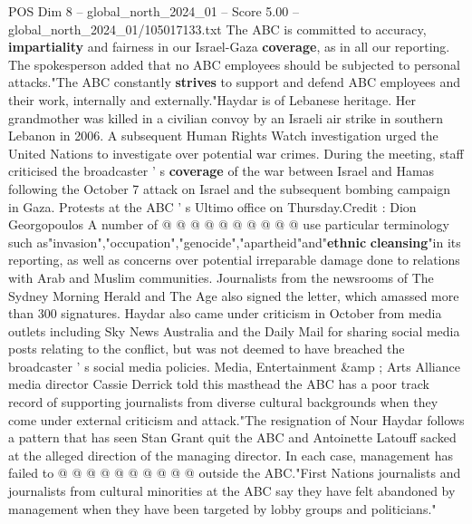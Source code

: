\begin{textsample}{POS Dim 8 – global\_north\_2024\_01 – Score 5.00 – global\_north\_2024\_01/105017133.txt}
The ABC is committed to accuracy, \textbf{impartiality} and fairness in our Israel-Gaza \textbf{coverage}, as in all our reporting.
The spokesperson added that no ABC employees should be subjected to personal attacks."The ABC constantly \textbf{strives} to support and defend ABC employees and their work, internally and externally."Haydar is of Lebanese heritage.
Her grandmother was killed in a civilian convoy by an Israeli air strike in southern Lebanon in 2006.
A subsequent Human Rights Watch investigation urged the United Nations to investigate over potential war crimes.
During the meeting, staff criticised the broadcaster ' s \textbf{coverage} of the war between Israel and Hamas following the October 7 attack on Israel and the subsequent bombing campaign in Gaza.
Protests at the ABC ' s Ultimo office on Thursday.Credit : Dion Georgopoulos A number of @ @ @ @ @ @ @ @ @ @ use particular terminology such as"invasion","occupation","genocide","apartheid"and"\textbf{ethnic} \textbf{cleansing}"in its reporting, as well as concerns over potential irreparable damage done to relations with Arab and Muslim communities.
Journalists from the newsrooms of The Sydney Morning Herald and The Age also signed the letter, which amassed more than 300 signatures.
Haydar also came under criticism in October from media outlets including Sky News Australia and the Daily Mail for sharing social media posts relating to the conflict, but was not deemed to have breached the broadcaster ' s social media policies.
Media, Entertainment \&amp ; Arts Alliance media director Cassie Derrick told this masthead the ABC has a poor track record of supporting journalists from diverse cultural backgrounds when they come under external criticism and attack."The resignation of Nour Haydar follows a pattern that has seen Stan Grant quit the ABC and Antoinette Latouff sacked at the alleged direction of the managing director.
In each case, management has failed to @ @ @ @ @ @ @ @ @ @ outside the ABC."First Nations journalists and journalists from cultural minorities at the ABC say they have felt abandoned by management when they have been targeted by lobby groups and politicians."

\end{textsample}
